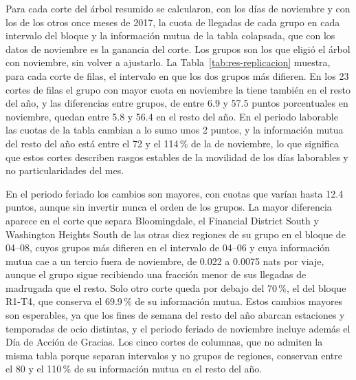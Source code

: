 Para cada corte del árbol resumido se calcularon, con los días de noviembre y con
los de los otros once meses de 2017, la cuota de llegadas de cada grupo en cada
intervalo del bloque y la información mutua de la tabla colapsada, que con los
datos de noviembre es la ganancia del corte. Los grupos son los que eligió el
árbol con noviembre, sin volver a ajustarlo. La Tabla~\ref{tab:res-replicacion}
muestra, para cada corte de filas, el intervalo en que los dos grupos más
difieren. En los 23 cortes de filas el grupo con mayor cuota en noviembre la tiene
también en el resto del año, y las diferencias entre grupos, de entre 6.9 y 57.5
puntos porcentuales en noviembre, quedan entre 5.8 y 56.4 en el resto del año. En
el periodo laborable las cuotas de la tabla cambian a lo sumo unos 2 puntos, y
la información mutua del resto del año está entre el 72 y el 114\,\% de la de
noviembre, lo que significa que estos cortes describen rasgos estables de la
movilidad de los días laborables y no particularidades del mes.

En el periodo feriado los cambios son mayores, con cuotas que varían hasta 12.4
puntos, aunque sin invertir nunca el orden de los grupos. La mayor diferencia
aparece en el corte que separa Bloomingdale, el Financial District South y
Washington Heights South de las otras diez regiones de su grupo en el bloque de
04--08, cuyos grupos más difieren en el intervalo de 04--06 y cuya información mutua cae a un tercio fuera de noviembre, de 0.022 a
0.0075 nats por viaje, aunque el grupo sigue recibiendo una fracción menor de sus
llegadas de madrugada que el resto. Solo otro corte queda por debajo del
70\,\%, el del bloque R1-T4, que conserva el 69.9\,\% de su información mutua.
Estos cambios mayores son esperables, ya que los fines de semana
del resto del año abarcan estaciones y temporadas de ocio distintas, y el
periodo feriado de noviembre incluye además el Día de Acción de Gracias. Los
cinco cortes de columnas, que no admiten la misma tabla porque separan
intervalos y no grupos de regiones, conservan entre el 80 y el 110\,\% de su
información mutua en el resto del año.

\begin{table}[t]
\centering
\small

\caption{Cortes de filas del árbol resumido y su repetición en el resto de 2017.
Cada bloque se identifica por su grupo de regiones R y de intervalos T de
ST-CC, numerados por volumen medio creciente. Para cada corte se muestra el
intervalo en que más difieren los dos grupos, el número de regiones de cada grupo
y su cuota de llegadas en ese intervalo, en noviembre y en el resto del año, y la
información mutua de la tabla colapsada en milésimas de nat por viaje.}
\label{tab:res-replicacion}
\end{table}

